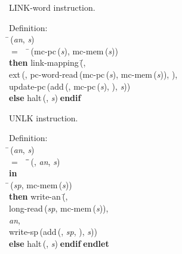  LINK-word instruction.
\begin{tabbing}{\sc Definition}: \\  
\=\,({\it{an\/}}, {\it{s\/}}) \\ 
$=$$\;\;\;\;$\=\,({\rm{mc-pc}}\,({\it{s\/}}), {\rm{mc-mem}}\,({\it{s\/}})) \\ 
{\bf then }{\rm{link-mapping}}\,(\=, \\ 
{\rm{ext}}\,({}, {\rm{pc-word-read}}\,({\rm{mc-pc}}\,({\it{s\/}}), {\rm{mc-mem}}\,({\it{s\/}})), {}), \\ 
{\rm{update-pc}}\,({\rm{add}}\,({}, {\rm{mc-pc}}\,({\it{s\/}}), {}), {\it{s\/}}))\- \\ 
{\bf else }{\rm{halt}}\,({}, {\it{s\/}})$\;${\bf  endif}\-\-
\end{tabbing}

 UNLK instruction.
\begin{tabbing}{\sc Definition}: \\  
\=\,({\it{an\/}}, {\it{s\/}}) \\ 
$=$$\;\;\;\;$\=\=\,({}, {\it{an\/}}, {\it{s\/}})\- \\ 
{\bf in} \\ 
\=\,({\it{sp\/}}, {\rm{mc-mem}}\,({\it{s\/}})) \\ 
{\bf then }{\rm{write-an}}\,(\=, \\ 
{\rm{long-read}}\,({\it{sp\/}}, {\rm{mc-mem}}\,({\it{s\/}})), \\ 
{\it{an\/}}, \\ 
{\rm{write-sp}}\,({\rm{add}}\,({}, {\it{sp\/}}, {}), {\it{s\/}}))\- \\ 
{\bf else }{\rm{halt}}\,({}, {\it{s\/}})$\;${\bf  endif}\-$\;${\bf  endlet}\-\-
\end{tabbing}

